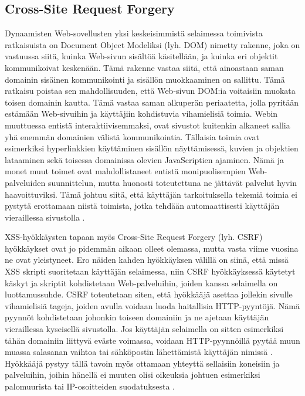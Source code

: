 \subsection{Cross-Site Request Forgery}

Dynaamisten Web-sovellusten yksi keskeisimmistä selaimessa toimivista ratkaisuista on Document Object Modeliksi (lyh. DOM) nimetty rakenne, joka on vastuussa siitä,
kuinka Web-sivun sisältöä käsitellään, ja kuinka eri objektit kommunikoivat keskenään. Tämä rakenne vastaa siitä, että ainoastaan saman domainin 
sisäinen kommunikointi ja sisällön muokkaaminen on sallittu. Tämä ratkaisu poistaa sen mahdollisuuden, että Web-sivun DOM:ia voitaisiin muokata toisen
domainin kautta. Tämä vastaa saman alkuperän periaatetta, jolla pyritään estämään Web-sivuihin ja käyttäjiin kohdistuvia vihamielisiä toimia.
Webin muuttuessa entistä interaktiivisemmaksi, ovat sivustot kuitenkin alkaneet sallia yhä enemmän domainien välistä kommunikointia. Tällaisia 
toimia ovat esimerkiksi hyperlinkkien käyttäminen sisällön näyttämisessä, kuvien ja objektien lataaminen sekä toisessa domainissa olevien 
JavaScriptien ajaminen. Nämä ja monet muut toimet ovat mahdollistaneet entistä monipuolisempien Web-palveluiden suunnittelun, mutta huonosti toteutettuna 
ne jättävät palvelut hyvin haavoittuviksi. Tämä johtuu siitä, että käyttäjän tarkoituksella tekemiä toimia ei pystytä erottamaan niistä toimista, jotka tehdään 
automaattisesti käyttäjän vieraillessa sivustolla \cite{WEB2}.

XSS-hyökkäysten tapaan myös Cross-Site Request Forgery (lyh. CSRF) hyökkäykset ovat jo pidemmän aikaan olleet olemassa, mutta vasta viime vuosina ne
ovat yleistyneet. Ero näiden kahden hyökkäyksen välillä on siinä, että missä XSS skripti suoritetaan käyttäjän selaimessa, niin CSRF hyökkäyksessä käytetyt
käskyt ja skriptit kohdistetaan Web-palveluihin, joiden kanssa selaimella on luottamussuhde. CSRF toteutetaan siten, että hyökkääjä asettaa jollekin sivulle
vihamielisiä tageja, joiden avulla voidaan luoda haitallisia HTTP-pyyntöjä. Nämä pyynnöt kohdistetaan johonkin toiseen domainiin ja ne ajetaan käyttäjän 
vieraillessa kyseisellä sivustolla. Jos käyttäjän selaimella on sitten esimerkiksi tähän domainiin liittyvä eväste voimassa, voidaan HTTP-pyynnöillä pyytää muun muassa
salasanan vaihtoa tai sähköpostin lähettämistä käyttäjän nimissä \cite{WEB2b}. Hyökkääjä pystyy tällä tavoin myös ottamaan yhteyttä sellaisiin koneisiin ja palveluihin,
joihin hänellä ei muuten olisi oikeuksia johtuen esimerkiksi palomuurista tai IP-osoitteiden suodatuksesta \cite{CSRF}.


